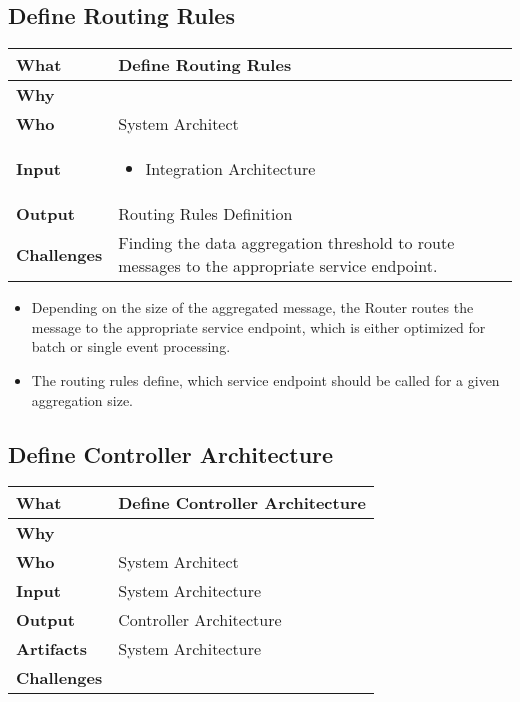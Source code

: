 \subsection{Define Routing Rules}

\begin{minipage}{\textwidth}
 \label{table:ch6_Task_Define_Routing_Rules}
\begin{tabular}
	{|m{3cm}|m{10cm}|} \hline \bfseries What & Define Routing Rules\\
	\hline \bfseries Why & \\
	\hline \bfseries Who & System Architect\\
	\hline \bfseries Input & 
		\begin{itemize}
			\item Integration Architecture
		\end{itemize}
	\\
	\hline \bfseries Output & Routing Rules Definition\\
	\hline \bfseries Challenges & Finding the data aggregation threshold to route messages to the appropriate service endpoint.\\
	\hline 
\end{tabular}
\end{minipage}

\begin{itemize}
	\item Depending on the size of the aggregated message, the Router routes the message to the appropriate service endpoint, which is either optimized for batch or single event processing.
	\item The routing rules define, which service endpoint should be called for a given aggregation size.
\end{itemize}

\subsection{Define Controller Architecture}
\begin{minipage}{\textwidth}
 \label{table:ch6_Task_Define_Controller_Architecture}
\begin{tabular}
	{|m{3cm}|m{10cm}|} \hline \bfseries What & Define Controller Architecture\\
	\hline \bfseries Why & \\
	\hline \bfseries Who & System Architect\\
	\hline \bfseries Input & System Architecture\\
	\hline \bfseries Output & Controller Architecture\\
	\hline \bfseries Artifacts & System Architecture\\
	\hline \bfseries Challenges & \\
	\hline 
\end{tabular}
\end{minipage}

